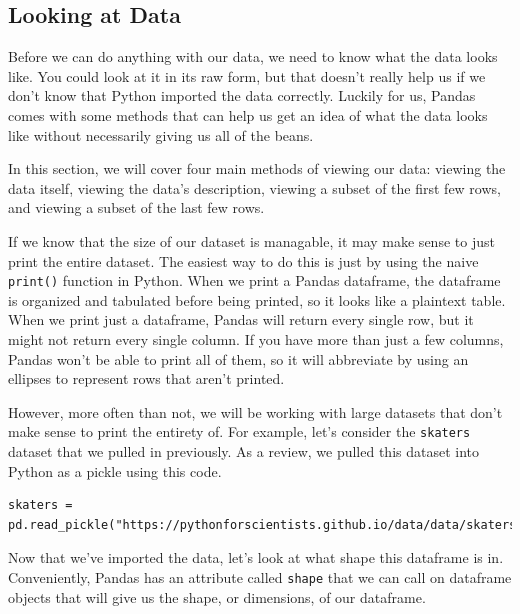 \subsection{Looking at Data}
Before we can do anything with our data, we need to know what the data looks like. You could look at it in its raw form, but that doesn't really help us if we don't know that Python imported the data correctly. Luckily for us, Pandas comes with some methods that can help us get an idea of what the data looks like without necessarily giving us all of the beans.\par
{}
In this section, we will cover four main methods of viewing our data: viewing the data itself, viewing the data's description, viewing a subset of the first few rows, and viewing a subset of the last few rows.\par
If we know that the size of our dataset is managable, it may make sense to just print the entire dataset. The easiest way to do this is just by using the naive \verb|print()| function in Python. When we print a Pandas dataframe, the dataframe is organized and tabulated before being printed, so it looks like a plaintext table. When we print just a dataframe, Pandas will return every single row, but it might not return every single column. If you have more than just a few columns, Pandas won't be able to print all of them, so it will abbreviate by using an ellipses to represent rows that aren't printed.\par
However, more often than not, we will be working with large datasets that don't make sense to print the entirety of. For example, let's consider the \verb|skaters| dataset that we pulled in previously. As a review, we pulled this dataset into Python as a pickle using this code.\par
\begin{lstlisting}[style=pippython]
skaters = pd.read_pickle("https://pythonforscientists.github.io/data/data/skaters.pkl")
\end{lstlisting}
Now that we've imported the data, let's look at what shape this dataframe is in. Conveniently, Pandas has an attribute called \verb|shape| that we can call on dataframe objects that will give us the shape, or dimensions, of our dataframe.\par
